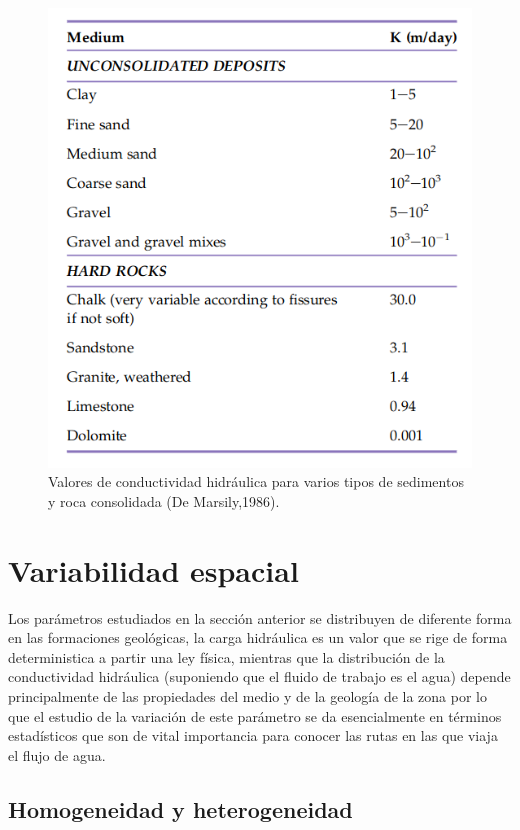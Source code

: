 \begin{figure}[ht!]
\centering
\includegraphics[scale=0.60]{Figura2.png}
\caption{Valores de conductividad hidráulica para varios tipos de sedimentos y roca consolidada (De Marsily,1986).}
\label{Figura2:1.2}
\end{figure}
\newpage

\section{Variabilidad espacial}

Los parámetros estudiados en la sección anterior se distribuyen de diferente forma en las formaciones geológicas, la carga hidráulica es un valor que se rige de forma deterministica a partir una ley física, mientras que la distribución de la conductividad hidráulica (suponiendo que el fluido de trabajo es el agua) depende principalmente de las propiedades del medio y de la geología de la zona por lo que el estudio de la variación de este parámetro se da esencialmente en términos estadísticos que son de vital importancia para conocer las rutas en las que viaja el flujo de agua.

\subsection{Homogeneidad y heterogeneidad}


